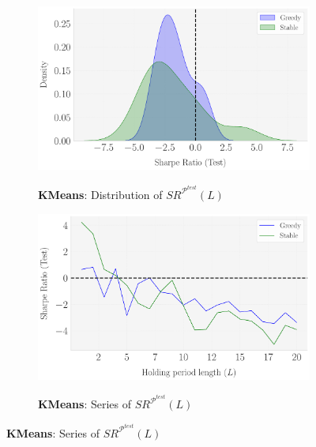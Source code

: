 \begin{figure}[H]
  \centering
  \caption{Sensitivity of $SR^{\mathcal P^{test}}$ to the holding window length ($L$)}
    \begin{subfigure}[b]{0.44\textwidth}
    \centering
	\caption{\textbf{KMeans}: Distribution of $SR^{\mathcal P^{test}}(L)$}
    \includegraphics[width=\textwidth]{fig_9a_KMeans_Distr_L(SR-Test).pdf}
    \label{fig:KMeans_Robustness_L_Distr}
  \end{subfigure}
  \hspace{0.05\textwidth} %
  \begin{subfigure}[b]{0.44\textwidth}
    \centering
    \caption{\textbf{KMeans}: Series of $SR^{\mathcal P^{test}}(L)$}
    \includegraphics[width=\textwidth]{fig_9b_KMeans_SR-Test_vs_L.pdf}
    \label{fig:KMeans_Robustness_L_Series}
  \end{subfigure}
  

\end{figure}
